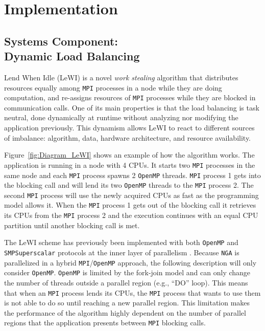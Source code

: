 \documentclass[letterpaper,twocolumn,10pt]{article}
\begin{document}
\section{Implementation}
\subsection{Systems Component: \\Dynamic Load Balancing}
Lend When Idle \cite{LeWI_ICPP09,GARCIA2014,DLB_OpenMP_SMPS} (LeWI) is a novel \emph{work stealing} \cite{Work_Stealing} algorithm that distributes resources equally among \texttt{MPI} processes in a node while they are doing computation, and re-assigns resources of \texttt{MPI} processes while they are blocked in communication calls. One of its main properties is that the load balancing is task neutral, done dynamically at runtime without analyzing nor modifying the application previously. This dynamism allows LeWI to react to different sources of imbalance: algorithm, data, hardware architecture, and resource availability.

Figure~\ref{fig:Diagram_LeWI} shows an example of how the algorithm works. The application is running in a node with 4 CPUs. It starts two \texttt{MPI} processes in the same node and each \texttt{MPI} process spawns 2 \texttt{OpenMP} threads. \texttt{MPI} process 1 gets into the blocking call and will lend its two \texttt{OpenMP} threads to the \texttt{MPI} process 2. The second \texttt{MPI} process will use the newly acquired CPUs as fast as the programming model allows it. When the \texttt{MPI} process 1 gets out of the blocking call it retrieves its CPUs from the \texttt{MPI} process 2 and the execution continues with an equal CPU partition until another blocking call is met.

The LeWI scheme has previously been implemented with both \texttt{OpenMP} and \texttt{SMPSuperscalar} protocols at the inner layer of parallelism \cite{DLB_OpenMP_SMPS}. Because \texttt{NGA} is parallelized in a hybrid \texttt{MPI}/\texttt{OpenMP} approach, the following description will only consider \texttt{OpenMP}. \texttt{OpenMP} is limited by the fork-join model and can only change the number of threads outside a parallel region (e.g., ``DO'' loop). This means that when an \texttt{MPI} process lends its CPUs, the \texttt{MPI} process that wants to use them is not able to do so until reaching a new parallel region. This limitation makes the performance of the algorithm highly dependent on the number of parallel regions that the application presents between \texttt{MPI} blocking calls. 
\end{document}
